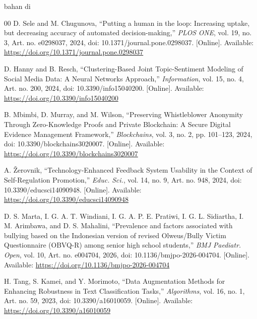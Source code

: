 bahan di\documentclass[conference]{IEEEtran}
\begin{document}
\begin{thebibliography}{00}
D. Sele and M. Chugunova, ``Putting a human in the loop: Increasing uptake, but decreasing accuracy of automated decision-making,'' \textit{PLOS ONE}, vol. 19, no. 3, Art. no. e0298037, 2024, doi: 10.1371/journal.pone.0298037. [Online]. Available: \url{https://doi.org/10.1371/journal.pone.0298037}

D. Hanny and B. Resch, ``Clustering-Based Joint Topic-Sentiment Modeling of Social Media Data: A Neural Networks Approach,'' \textit{Information}, vol. 15, no. 4, Art. no. 200, 2024, doi: 10.3390/info15040200. [Online]. Available: \url{https://doi.org/10.3390/info15040200}

B. Mbimbi, D. Murray, and M. Wilson, ``Preserving Whistleblower Anonymity Through Zero-Knowledge Proofs and Private Blockchain: A Secure Digital Evidence Management Framework,'' \textit{Blockchains}, vol. 3, no. 2, pp. 101--123, 2024, doi: 10.3390/blockchains3020007. [Online]. Available: \url{https://doi.org/10.3390/blockchains3020007}

A. \v{Z}erovnik, ``Technology-Enhanced Feedback System Usability in the Context of Self-Regulation Promotion,'' \textit{Educ. Sci.}, vol. 14, no. 9, Art. no. 948, 2024, doi: 10.3390/educsci14090948. [Online]. Available: \url{https://doi.org/10.3390/educsci14090948}

D. S. Marta, I. G. A. T. Windiani, I. G. A. P. E. Pratiwi, I. G. L. Sidiartha, I. M. Arimbawa, and D. S. Mahalini, ``Prevalence and factors associated with bullying based on the Indonesian version of revised Olweus/Bully Victim Questionnaire (OBVQ-R) among senior high school students,'' \textit{BMJ Paediatr. Open}, vol. 10, Art. no. e004704, 2026, doi: 10.1136/bmjpo-2026-004704. [Online]. Available: \url{https://doi.org/10.1136/bmjpo-2026-004704}

H. Tang, S. Kamei, and Y. Morimoto, ``Data Augmentation Methods for Enhancing Robustness in Text Classification Tasks,'' \textit{Algorithms}, vol. 16, no. 1, Art. no. 59, 2023, doi: 10.3390/a16010059. [Online]. Available: \url{https://doi.org/10.3390/a16010059}
\end{thebibliography}
\end{document}

